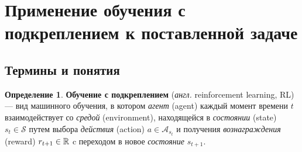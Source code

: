\documentclass[specification,annotation,times]{itmo-student-thesis}
\theoremstyle{definition}
\newtheorem{definition-ru}{Определение}
\begin{document}








\section{Применение обучения с подкреплением к поставленной задаче}

\subsection{Термины и понятия}

\begin{definition-ru}
  \textbf{Обучение с подкреплением} (\textit{англ.} reinforcement learning, RL) --- вид машинного
  обучения, в котором \textit{агент} (agent) каждый момент времени $t$ 
  взаимодействует со \textit{средой} (environment), находящейся в
  \textit{состоянии} (state) $s_t \in \mathcal{S}$ путем выбора
  \textit{действия} (action) $a \in \mathcal{A}_{s_t}$ и получения
  \textit{вознаграждения} (reward) $r_{t+1} \in \Bbb{R}$ c переходом в новое
  \textit{состояние} $s_{t+1}$.
\end{definition-ru}
\end{document}

